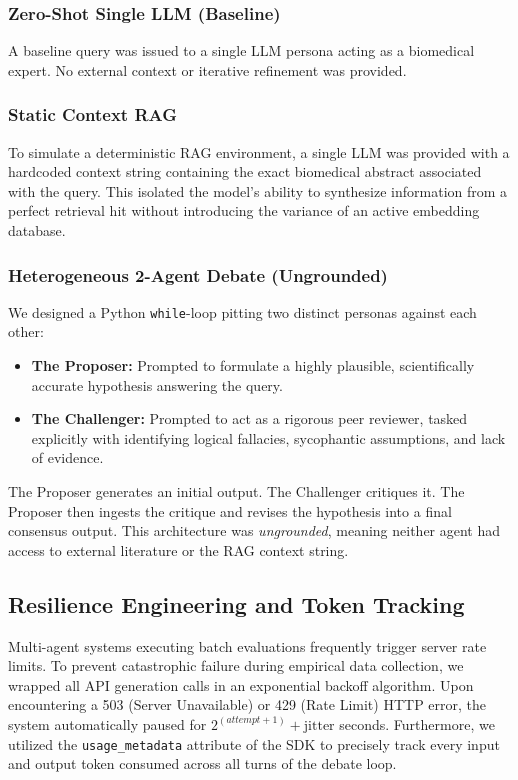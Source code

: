 \documentclass[11pt, conference, onecolumn]{IEEEtran}
\begin{document}
\subsubsection{Zero-Shot Single LLM (Baseline)}
A baseline query was issued to a single LLM persona acting as a biomedical expert. No external context or iterative refinement was provided.

\subsubsection{Static Context RAG}
To simulate a deterministic RAG environment, a single LLM was provided with a hardcoded context string containing the exact biomedical abstract associated with the query. This isolated the model's ability to synthesize information from a perfect retrieval hit without introducing the variance of an active embedding database.

\subsubsection{Heterogeneous 2-Agent Debate (Ungrounded)}
We designed a Python \texttt{while}-loop pitting two distinct personas against each other:
\begin{itemize}
    \item \textbf{The Proposer:} Prompted to formulate a highly plausible, scientifically accurate hypothesis answering the query.
    \item \textbf{The Challenger:} Prompted to act as a rigorous peer reviewer, tasked explicitly with identifying logical fallacies, sycophantic assumptions, and lack of evidence.
\end{itemize}
The Proposer generates an initial output. The Challenger critiques it. The Proposer then ingests the critique and revises the hypothesis into a final consensus output. This architecture was \textit{ungrounded}, meaning neither agent had access to external literature or the RAG context string.

\subsection{Resilience Engineering and Token Tracking}
Multi-agent systems executing batch evaluations frequently trigger server rate limits. To prevent catastrophic failure during empirical data collection, we wrapped all API generation calls in an exponential backoff algorithm. Upon encountering a 503 (Server Unavailable) or 429 (Rate Limit) HTTP error, the system automatically paused for $2^{(attempt+1)} + \text{jitter}$ seconds. Furthermore, we utilized the \texttt{usage\_metadata} attribute of the SDK to precisely track every input and output token consumed across all turns of the debate loop.
\end{document}
